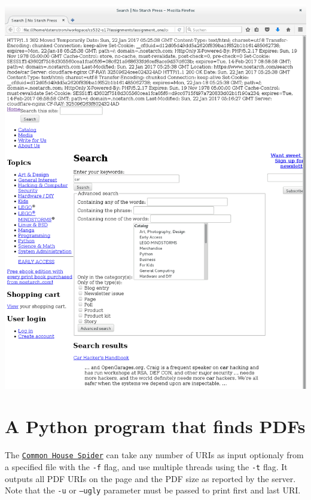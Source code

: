 \documentclass[12pt, a4paper]{article}
\newcommand{\code}[1]{\texttt{#1}}
\begin{document}
\href{https://gitlab.com/datenstrom/cs532-s17/blob/master/assignments/assignment_one/curl/results.html}{
\includegraphics[width=\textwidth]{dia/curl_screenshot.png}
}



\section{A Python program that finds PDFs}

The \href{https://gitlab.com/datenstrom/cs532-s17/tree/master/assignments/assignment_one/common_house_spider}
{\code{Common House Spider}} can take any number of URIs as input
optionaly from a specified file with the \code{-f} flag, and use
multiple threads using the \code{-t} flag.
It outputs all PDF URIs on the page and the PDF size as reported
by the server. Note that the \code{-u} or \code{--ugly} parameter must be
passed to print first and last URI.
\end{document}
